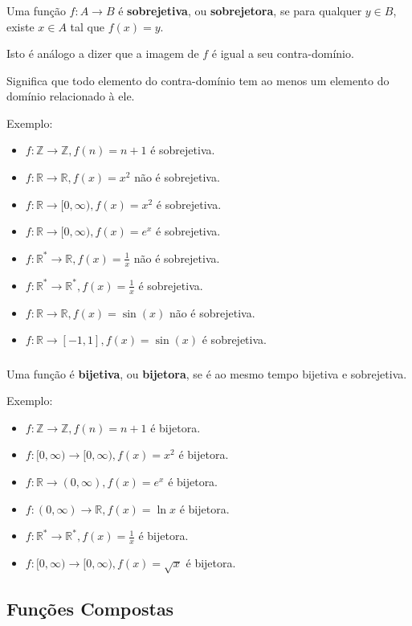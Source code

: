 \documentclass[10 pt]{beamer}
\newcommand{\makesubsection}[1]{\subsection[#1]{#1}}
\newcommand{\myframe}[1]{
\begin{frame}
 \frametitle{\insertsection \qquad {\small \insertsubsection}}
#1
\end{frame}}
\begin{document}
\myframe {
  Uma função $f:A\rightarrow B$ é {\bf sobrejetiva}, ou {\bf sobrejetora}, se
  para qualquer $y \in B$, existe $x \in A$
  tal que $f(x) = y$.

  Isto é análogo a dizer que a imagem de $f$ é igual a seu
  contra-domínio.

  Significa que todo elemento do contra-domínio tem ao menos
  um elemento do domínio relacionado à ele.

  Exemplo:
  \begin{itemize}
    \item $f:\mathbb{Z}\rightarrow\mathbb{Z}, f(n) = n + 1$ é sobrejetiva.
    \item $f:\mathbb{R}\rightarrow\mathbb{R}, f(x) = x^2$ não é sobrejetiva.
    \item $f:\mathbb{R}\rightarrow[0,\infty), f(x) = x^2$ é sobrejetiva.
    \item $f:\mathbb{R}\rightarrow[0,\infty), f(x) = e^x$ é sobrejetiva.
    \item $f:\mathbb{R}^*\rightarrow\mathbb{R}, f(x) = \frac{1}{x}$ não é sobrejetiva.
    \item $f:\mathbb{R}^*\rightarrow\mathbb{R}^*, f(x) = \frac{1}{x}$ é sobrejetiva.
    \item $f:\mathbb{R}\rightarrow\mathbb{R}, f(x) = \sin(x)$ não é sobrejetiva.
    \item $f:\mathbb{R}\rightarrow[-1,1], f(x) = \sin(x)$ é sobrejetiva.
  \end{itemize}
}

\myframe {
  Uma função é {\bf bijetiva}, ou {\bf bijetora}, se é ao mesmo tempo
  bijetiva e sobrejetiva.

  Exemplo:
  \begin{itemize}
    \item $f:\mathbb{Z}\rightarrow\mathbb{Z}, f(n) = n + 1$ é bijetora.
    \item $f:[0,\infty)\rightarrow[0,\infty), f(x) = x^2$ é bijetora.
    \item $f:\mathbb{R}\rightarrow(0,\infty), f(x) = e^x$ é bijetora.
    \item $f:(0,\infty)\rightarrow\mathbb{R}, f(x) = \ln x$ é bijetora.
    \item $f:\mathbb{R}^*\rightarrow\mathbb{R}^*, f(x) = \frac{1}{x}$ é bijetora.
    \item $f:[0,\infty)\rightarrow[0,\infty), f(x) = \sqrt{x}$ é bijetora.
  \end{itemize}
}

\makesubsection{Funções Compostas}
\end{document}

